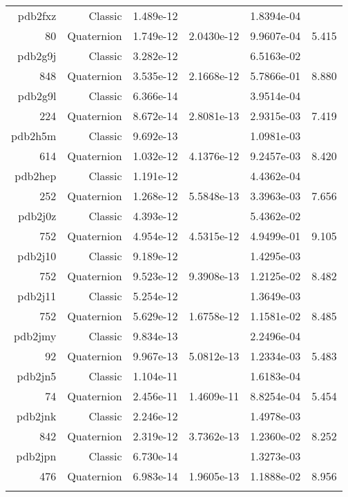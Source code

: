 \begin{xltabular}{\textwidth}{r|rS[table-format=1.3e+2]S[table-format=1.4e+2]S[table-format=1.4e+2]S[table-format=-1.3]}
pdb2fxz & Classic & 1.489e-12 &  & 1.8394e-04 & \\
80 & Quaternion & 1.749e-12 & 2.0430e-12 & 9.9607e-04 & 5.415\\  \addlinespace
pdb2g9j & Classic & 3.282e-12 &  & 6.5163e-02 & \\
848 & Quaternion & 3.535e-12 & 2.1668e-12 & 5.7866e-01 & 8.880\\  \addlinespace
pdb2g9l & Classic & 6.366e-14 &  & 3.9514e-04 & \\
224 & Quaternion & 8.672e-14 & 2.8081e-13 & 2.9315e-03 & 7.419\\  \addlinespace
pdb2h5m & Classic & 9.692e-13 &  & 1.0981e-03 & \\
614 & Quaternion & 1.032e-12 & 4.1376e-12 & 9.2457e-03 & 8.420\\  \addlinespace
pdb2hep & Classic & 1.191e-12 &  & 4.4362e-04 & \\
252 & Quaternion & 1.268e-12 & 5.5848e-13 & 3.3963e-03 & 7.656\\  \addlinespace
pdb2j0z & Classic & 4.393e-12 &  & 5.4362e-02 & \\
752 & Quaternion & 4.954e-12 & 4.5315e-12 & 4.9499e-01 & 9.105\\  \addlinespace
pdb2j10 & Classic & 9.189e-12 &  & 1.4295e-03 & \\
752 & Quaternion & 9.523e-12 & 9.3908e-13 & 1.2125e-02 & 8.482\\  \addlinespace
pdb2j11 & Classic & 5.254e-12 &  & 1.3649e-03 & \\
752 & Quaternion & 5.629e-12 & 1.6758e-12 & 1.1581e-02 & 8.485\\  \addlinespace
pdb2jmy & Classic & 9.834e-13 &  & 2.2496e-04 & \\
92 & Quaternion & 9.967e-13 & 5.0812e-13 & 1.2334e-03 & 5.483\\  \addlinespace
pdb2jn5 & Classic & 1.104e-11 &  & 1.6183e-04 & \\
74 & Quaternion & 2.456e-11 & 1.4609e-11 & 8.8254e-04 & 5.454\\  \addlinespace
pdb2jnk & Classic & 2.246e-12 &  & 1.4978e-03 & \\
842 & Quaternion & 2.319e-12 & 3.7362e-13 & 1.2360e-02 & 8.252\\  \addlinespace
pdb2jpn & Classic & 6.730e-14 &  & 1.3273e-03 & \\
476 & Quaternion & 6.983e-14 & 1.9605e-13 & 1.1888e-02 & 8.956\\  \addlinespace

\end{xltabular}
